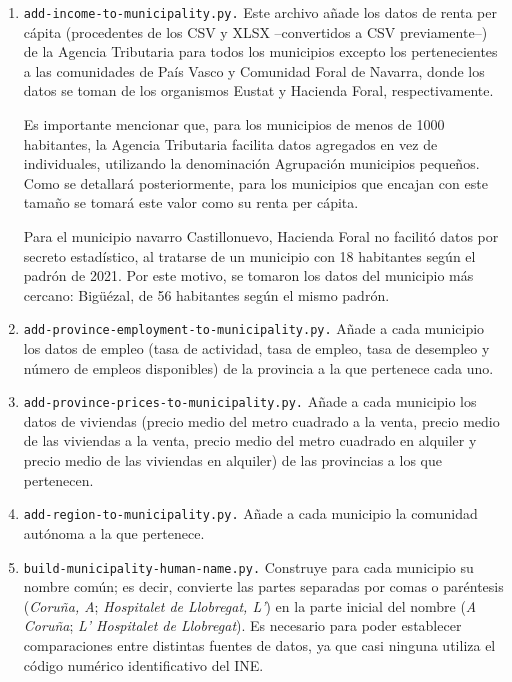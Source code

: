 \begin{enumerate}
    \item \texttt{add-income-to-municipality.py.} Este archivo añade los datos de renta per cápita (procedentes de los CSV y XLSX –convertidos a CSV previamente–) de la Agencia Tributaria para todos los municipios excepto los pertenecientes a las comunidades de País Vasco y Comunidad Foral de Navarra, donde los datos se toman de los organismos Eustat y Hacienda Foral, respectivamente.

    Es importante mencionar que, para los municipios de menos de 1000 habitantes, la Agencia Tributaria facilita datos agregados en vez de individuales, utilizando la denominación \guillemotleft Agrupación municipios pequeños\guillemotright. Como se detallará posteriormente, para los municipios que encajan con este tamaño se tomará este valor como su renta per cápita.

    Para el municipio navarro Castillonuevo, Hacienda Foral no facilitó datos por secreto estadístico, al tratarse de un municipio con 18 habitantes según el padrón de 2021. Por este motivo, se tomaron los datos del municipio más cercano: Bigüézal, de 56 habitantes según el mismo padrón.

    \item \texttt{add-province-employment-to-municipality.py.} Añade a cada municipio los datos de empleo (tasa de actividad, tasa de empleo, tasa de desempleo y número de empleos disponibles) de la provincia a la que pertenece cada uno.
    
    \item \texttt{add-province-prices-to-municipality.py.} Añade a cada municipio los datos de viviendas (precio medio del metro cuadrado a la venta, precio medio de las viviendas a la venta, precio medio del metro cuadrado en alquiler y precio medio de las viviendas en alquiler) de las provincias a los que pertenecen.
    
    \item \texttt{add-region-to-municipality.py.} Añade a cada municipio la comunidad autónoma a la que pertenece.
    
    \item \texttt{build-municipality-human-name.py.} Construye para cada municipio su nombre común; es decir, convierte las partes separadas por comas o paréntesis (\textit{Coruña, A}; \textit{Hospitalet de Llobregat, L'}) en la parte inicial del nombre (\textit{A Coruña}; \textit{L' Hospitalet de Llobregat}). Es necesario para poder establecer comparaciones entre distintas fuentes de datos, ya que casi ninguna utiliza el código numérico identificativo del INE.
    

\end{enumerate}

